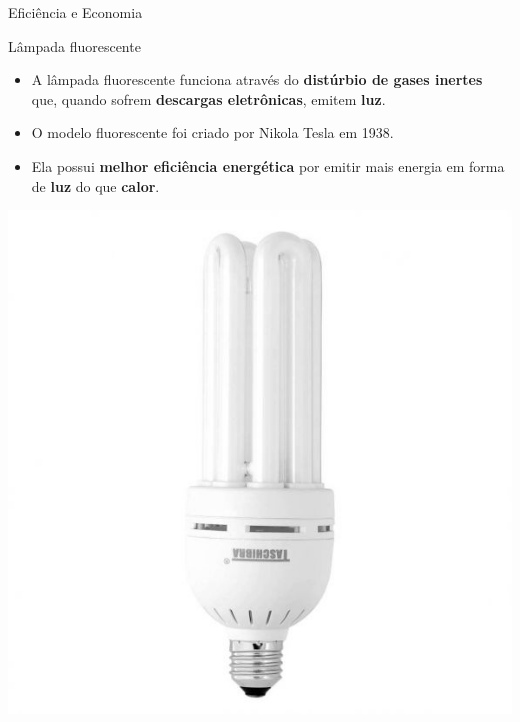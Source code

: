 \begin{frame}{Eficiência e Economia}
	\begin{block}{Lâmpada fluorescente}
		\begin{itemize}
			\item A lâmpada fluorescente funciona através do \textbf{distúrbio de gases inertes} que, quando sofrem \textbf{descargas eletrônicas}, emitem \textbf{luz}.
			\item O modelo fluorescente foi criado por Nikola Tesla em 1938.
			\item Ela possui \textbf{melhor eficiência energética} por emitir mais energia em forma de \textbf{luz} do que \textbf{calor}.
		\end{itemize}
	\end{block}

	\centering
	\includegraphics[height=0.5\textheight]{Figuras/Ch07/fig10}
\end{frame}


